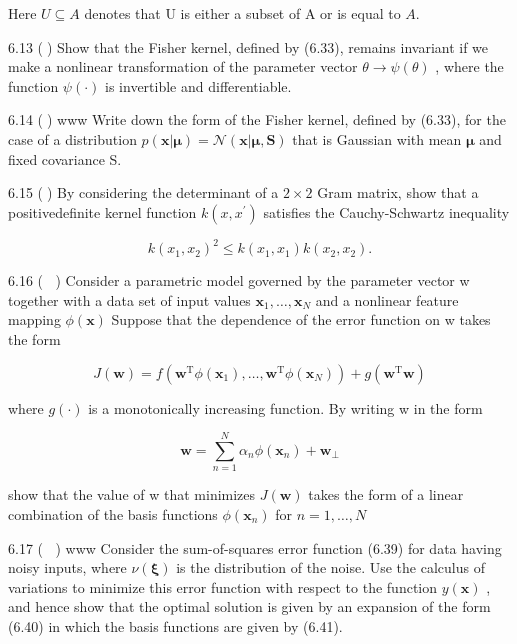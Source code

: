 \documentclass[
  10
]{article}
\begin{document}
Here \(U \subseteq A\) denotes that U is either a subset of A or is
equal to \(A .\)

6.13 () Show that the Fisher kernel, defined by (6.33), remains
invariant if we make a nonlinear transformation of the parameter vector
\(\theta \to \psi ( \theta )\) , where the function \(\psi ( \cdot )\)
is invertible and differentiable.

6.14 () www Write down the form of the Fisher kernel, defined by (6.33),
for the case of a distribution
\(p ( \mathbf { x } | \pmb { \mu } ) = \mathcal { N } ( \mathbf { x } | \pmb { \mu } , \mathbf { S } )\)
that is Gaussian with mean \(\pmb { \mu }\) and fixed covariance S.

6.15 () By considering the determinant of a \(2 \times 2\) Gram matrix,
show that a positivedefinite kernel function
\(k ( x , x ^ { \prime } )\) satisfies the Cauchy-Schwartz inequality

\[
k (x _ {1}, x _ {2}) ^ {2} \leqslant k (x _ {1}, x _ {1}) k (x _ {2}, x _ {2}).\tag{6.96}
\]

6.16 ( ) Consider a parametric model governed by the parameter vector w
together with a data set of input values
\(\mathbf { x } _ { 1 } , \ldots , \mathbf { x } _ { N }\) and a
nonlinear feature mapping \(\phi ( \mathbf { x } )\) Suppose that the
dependence of the error function on w takes the form

\[
J (\mathbf {w}) = f (\mathbf {w} ^ {\mathrm{T}} \phi (\mathbf {x} _ {1}), \ldots , \mathbf {w} ^ {\mathrm{T}} \phi (\mathbf {x} _ {N})) + g (\mathbf {w} ^ {\mathrm{T}} \mathbf {w})\tag{6.97}
\]

where \(g ( \cdot )\) is a monotonically increasing function. By writing
w in the form

\[
\mathbf {w} = \sum_ {n = 1} ^ {N} \alpha_ {n} \phi (\mathbf {x} _ {n}) + \mathbf {w} _ {\perp}\tag{6.98}
\]

show that the value of w that minimizes \(J ( \mathbf { w } )\) takes
the form of a linear combination of the basis functions
\(\phi (  { \mathbf { x } } _ { n } )\) for \(n = 1 , \ldots , N\)

6.17 ( ) www Consider the sum-of-squares error function (6.39) for data
having noisy inputs, where \(\nu ( \pmb { \xi } )\) is the distribution
of the noise. Use the calculus of variations to minimize this error
function with respect to the function \(y ( \mathbf x )\) , and hence
show that the optimal solution is given by an expansion of the form
(6.40) in which the basis functions are given by (6.41).
\end{document}
